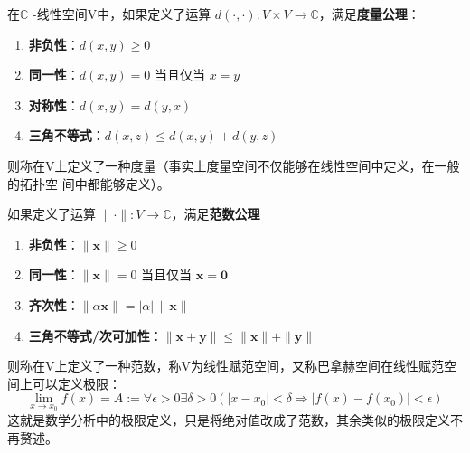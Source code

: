 \documentclass{ctexbook}
\begin{document}
在$\mathbb{C}$ -线性空间V中，如果定义了运算
$d(\cdot,\cdot):V\times V\rightarrow \mathbb{C}  $，满足\textbf{度量公理}：
\begin{enumerate}
    \item \textbf{非负性}：$d(x, y) \geq 0$
    \item \textbf{同一性}：$d(x, y) = 0$ 当且仅当 $x = y$
    \item \textbf{对称性}：$d(x, y) = d(y, x)$
    \item \textbf{三角不等式}：$d(x, z) \leq d(x, y) + d(y, z)$
\end{enumerate}
则称在V上定义了一种度量（事实上度量空间不仅能够在线性空间中定义，在一般的拓扑空
间中都能够定义）。

如果定义了运算
$\|\cdot \| :V\rightarrow \mathbb{C} $，满足\textbf{范数公理}
\begin{enumerate}
    \item \textbf{非负性}：$\|\mathbf{x}\| \geq 0$
    \item \textbf{同一性}：$\|\mathbf{x}\| = 0$ 当且仅当 $\mathbf{x} = \mathbf{0}$
    \item \textbf{齐次性}：$\|\alpha \mathbf{x}\| = |\alpha| \, \|\mathbf{x}\|$
    \item \textbf{三角不等式/次可加性}：$\|\mathbf{x} + \mathbf{y}\| \leq \|\mathbf{x}\| + \|\mathbf{y}\|$
\end{enumerate}
则称在V上定义了一种范数，称V为线性赋范空间，又称巴拿赫空间在线性赋范空间上可以定义极限：
\[\lim_{x \to x_0} f(x)=A:=\forall \epsilon>0\exists \delta>0(|x-x_0|<\delta\Rightarrow |f(x)-f(x_0)|<\epsilon) \]
这就是数学分析中的极限定义，只是将绝对值改成了范数，其余类似的极限定义不再赘述。
\end{document}
